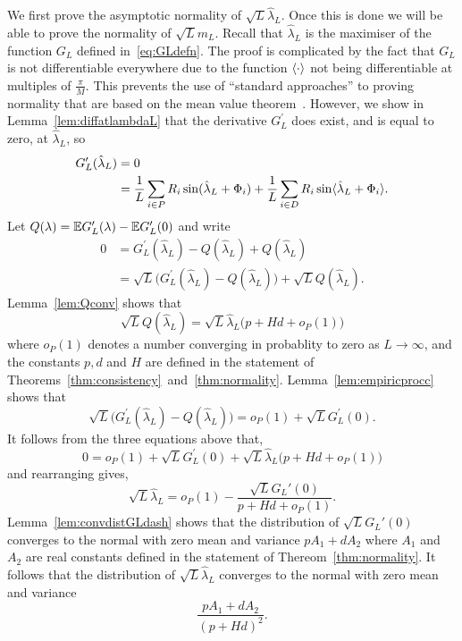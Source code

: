 \documentclass[journal]{IEEEtran}
\begin{document}
We first prove the asymptotic normality of $\sqrt{L} \hat{\lambda}_L$.  Once this is done we will be able to prove the normality of $\sqrt{L} m_L$.  Recall that $\hat{\lambda}_L$ is the maximiser of the function $G_L$ defined in~\eqref{eq:GLdefn}.  The proof is complicated by the fact that $G_L$ is not differentiable everywhere due to the function $\left\langle \cdot \right\rangle$ not being differentiable at multiples of $\tfrac{\pi}{M}$.  This prevents the use of ``standard approaches'' to proving normality that are based on the mean value theorem~\cite{vonMises_diff_stats_1947,vanDerVart1971_asymptotic_stats,Pollard_new_ways_clts_1986,Pollard_conv_stat_proc_1984,Pollard_asymp_empi_proc_1989}.  However, we show in Lemma~\ref{lem:diffatlambdaL} that the derivative $G_L^\prime$ does exist, and is equal to zero, at $\hat{\lambda}_L$, so
\begin{align*}
G_L^\prime(\hat{\lambda}_L) &= 0 \\
&= \frac{1}{L} \sum_{i \in P} R_i \sin(\hat{\lambda}_L + \Phi_i) + \frac{1}{L} \sum_{i \in D} R_i \sin\langle \hat{\lambda}_L + \Phi_i \rangle.
\end{align*}
Let $Q(\lambda) = {\mathbb E} G_L^\prime(\lambda) - {\mathbb E} G_L^\prime(0)$ and write
\begin{align*}
0 &= G_L^\prime(\hat{\lambda}_L) - Q(\hat{\lambda}_L) + Q(\hat{\lambda}_L) \\
&= \sqrt{L}\big( G_L^\prime(\hat{\lambda}_L) - Q(\hat{\lambda}_L) \big) + \sqrt{L}Q(\hat{\lambda}_L).
\end{align*}
Lemma~\ref{lem:Qconv} shows that
\[
\sqrt{L} Q(\hat{\lambda}_L) = \sqrt{L} \hat{\lambda}_L\big( p + Hd  + o_P(1) \big)
\]
where $o_P(1)$ denotes a number converging in probablity to zero as $L \rightarrow \infty$, and the constants $p,d$ and $H$ are defined in the statement of Theorems~\ref{thm:consistency}~and~\ref{thm:normality}.  Lemma~\ref{lem:empiricprocc} shows that
\[
\sqrt{L}\big( G_L^\prime(\hat{\lambda}_L) - Q(\hat{\lambda}_L) \big) = o_P(1) + \sqrt{L} G_L^\prime(0).
\]
It follows from the three equations above that,
\[
0 = o_P(1) + \sqrt{L}G_L^\prime(0) + \sqrt{L} \hat{\lambda}_L \big( p + Hd  + o_P(1) \big)
\]
and rearranging gives,
\[
\sqrt{L} \hat{\lambda}_L = o_P(1) - \frac{\sqrt{L}G_L'(0)}{p + Hd  + o_P(1)}.
\]
Lemma~\ref{lem:convdistGLdash} shows that the distribution of $\sqrt{L}G_L'(0)$ converges to the normal with zero mean and variance $pA_1 + dA_2$ where $A_1$ and $A_2$ are real constants defined in the statement of Thereom~\ref{thm:normality}.  It follows that the distribution of $\sqrt{L}\hat{\lambda}_L$ converges to the normal with zero mean and variance
\[
\frac{pA_1 + dA_2}{(p + Hd)^2}.
\]
 
\end{document}

